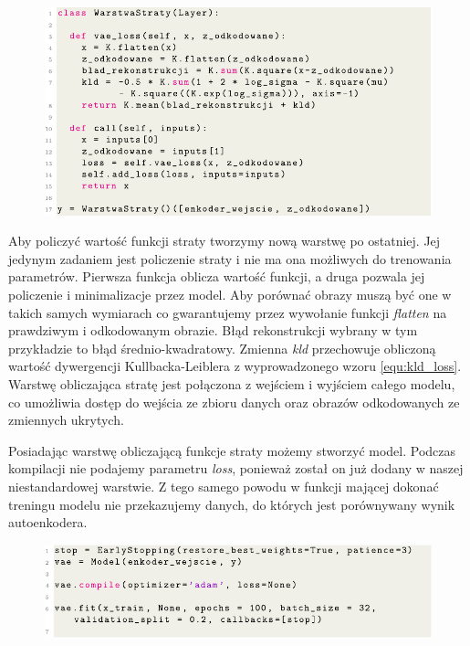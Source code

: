 \documentclass[a4paper,12pt]{book} %
\begin{document}
\begin{figure}[h!]
	\centering
	\includegraphics[width=\linewidth]{vaeloss.pdf}
\end{figure}

\newpage
Aby policzyć wartość funkcji straty tworzymy nową warstwę po ostatniej. Jej jedynym zadaniem jest policzenie straty i nie ma ona możliwych do trenowania parametrów. Pierwsza funkcja oblicza wartość funkcji, a druga pozwala jej policzenie i minimalizacje przez model. Aby porównać obrazy muszą być one w takich samych wymiarach co gwarantujemy przez wywołanie funkcji \textit{flatten} na prawdziwym i odkodowanym obrazie. Błąd rekonstrukcji wybrany w tym przykładzie to błąd średnio-kwadratowy. Zmienna \textit{kld} przechowuje obliczoną wartość dywergencji Kullbacka-Leiblera z wyprowadzonego wzoru \ref{equ:kld_loss}. Warstwę obliczająca stratę jest połączona z wejściem i wyjściem całego modelu, co umożliwia dostęp do wejścia ze zbioru danych oraz obrazów odkodowanych ze zmiennych ukrytych. 


Posiadając warstwę obliczającą funkcje straty możemy stworzyć model. Podczas kompilacji nie podajemy parametru \textit{loss}, ponieważ został on już dodany w naszej niestandardowej warstwie. Z tego samego powodu w funkcji mającej dokonać treningu modelu nie przekazujemy danych, do których jest porównywany wynik autoenkodera.
\begin{figure}[h!]
	\centering
	\includegraphics[width=\linewidth]{vaetrain.pdf}
\end{figure}



\listoffigures{} %



\end{document}
